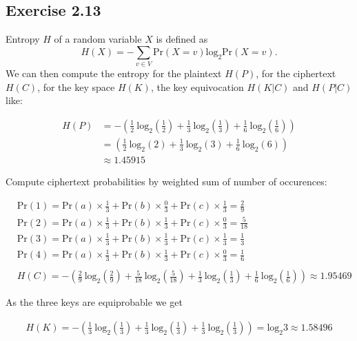 \documentclass[12pt]{article}
\begin{document}
\subsection*{Exercise 2.13}

Entropy $H$ of a random variable $X$ is defined as
$$
H(X) = - \sum_{v \in V} \text{Pr}(X=v)\text{log}_2\text{Pr}(X=v).
$$
We can then compute the entropy for the plaintext $H(P)$, for the ciphertext $H(C)$, for the key space $H(K)$, the key equivocation $H(K|C)$ and $H(P|C)$ like:

\begin{align*}
H(P) &= - \left(\frac{1}{2} \ \text{log}_2\left(\frac{1}{2}\right) + \frac{1}{3} \ \text{log}_2\left(\frac{1}{3}\right) + \frac{1}{6} \ \text{log}_2\left(\frac{1}{6}\right) \right)\\
&= \left(\frac{1}{2} \ \text{log}_2\left(2\right) + \frac{1}{3} \ \text{log}_2\left(3\right) + \frac{1}{6} \ \text{log}_2\left(6\right) \right)\\
&\approx 1.45915
\end{align*}

\noindent Compute ciphertext probabilities by weighted sum of number of occurences:

\begin{align*}
& \text{Pr}(1) = \text{Pr}(a) \times \frac{1}{3} + \text{Pr}(b) \times \frac{0}{3} + \text{Pr}(c) \times \frac{1}{3} = \frac{2}{9}\\
&\text{Pr}(2) = \text{Pr}(a) \times \frac{1}{3} + \text{Pr}(b) \times \frac{1}{3} + \text{Pr}(c) \times \frac{0}{3} = \frac{5}{18}\\
&\text{Pr}(3) = \text{Pr}(a) \times \frac{1}{3} + \text{Pr}(b) \times \frac{1}{3} + \text{Pr}(c) \times \frac{1}{3} = \frac{1}{3}\\
&\text{Pr}(4) = \text{Pr}(a) \times \frac{1}{3} + \text{Pr}(b) \times \frac{1}{3} + \text{Pr}(c) \times \frac{0}{3} = \frac{1}{6}\\
\\
& H(C) = - \left(\frac{2}{9} \ \text{log}_2\left(\frac{2}{9}\right) + \frac{5}{18} \ \text{log}_2\left(\frac{5}{18}\right) + \frac{1}{3} \ \text{log}_2\left(\frac{1}{3}\right) + \frac{1}{6} \ \text{log}_2\left(\frac{1}{6}\right) \right) \approx 1.95469
\end{align*}
\smallskip

\noindent As the three keys are equiprobable we get

\begin{align*}
H(K) = -\left( \frac{1}{3} \ \text{log}_2\left(\frac{1}{3}\right) + \frac{1}{3} \ \text{log}_2\left(\frac{1}{3}\right) + \frac{1}{3} \ \text{log}_2\left(\frac{1}{3}\right) \right) = \text{log}_2 3 \approx 1.58496
\end{align*}
\smallskip
\end{document}

